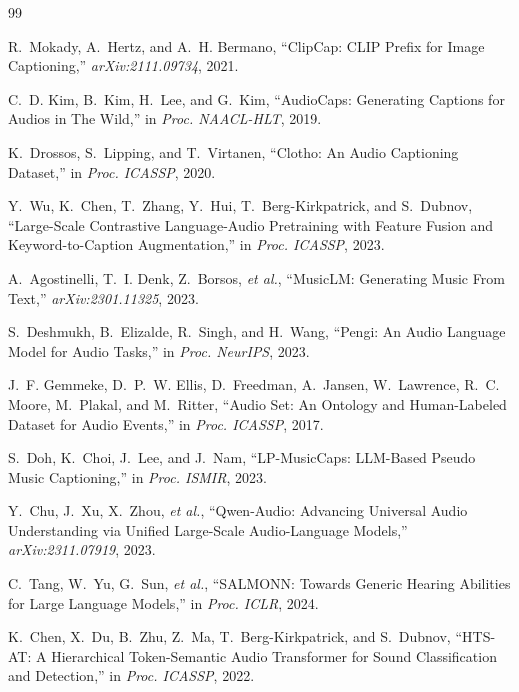 \documentclass[9pt]{report}
\begin{document}
\begingroup
\hypersetup{linkcolor=red}  %
\begin{thebibliography}{99}

R.~Mokady, A.~Hertz, and A.~H. Bermano,
``ClipCap: CLIP Prefix for Image Captioning,'' \emph{arXiv:2111.09734}, 2021.

C.~D. Kim, B.~Kim, H.~Lee, and G.~Kim,
``AudioCaps: Generating Captions for Audios in The Wild,'' in \emph{Proc. NAACL-HLT}, 2019.

K.~Drossos, S.~Lipping, and T.~Virtanen,
``Clotho: An Audio Captioning Dataset,'' in \emph{Proc. ICASSP}, 2020.

Y.~Wu, K.~Chen, T.~Zhang, Y.~Hui, T.~Berg-Kirkpatrick, and S.~Dubnov,
``Large-Scale Contrastive Language-Audio Pretraining with Feature Fusion and
Keyword-to-Caption Augmentation,'' in \emph{Proc. ICASSP}, 2023.

A.~Agostinelli, T.~I. Denk, Z.~Borsos, \emph{et al.},
``MusicLM: Generating Music From Text,'' \emph{arXiv:2301.11325}, 2023.

S.~Deshmukh, B.~Elizalde, R.~Singh, and H.~Wang,
``Pengi: An Audio Language Model for Audio Tasks,'' in \emph{Proc. NeurIPS}, 2023.

J.~F. Gemmeke, D.~P.~W. Ellis, D.~Freedman, A.~Jansen, W.~Lawrence, R.~C. Moore,
M.~Plakal, and M.~Ritter,
``Audio Set: An Ontology and Human-Labeled Dataset for Audio Events,'' in \emph{Proc. ICASSP},
2017.

S.~Doh, K.~Choi, J.~Lee, and J.~Nam,
``LP-MusicCaps: LLM-Based Pseudo Music Captioning,'' in \emph{Proc. ISMIR}, 2023.

Y.~Chu, J.~Xu, X.~Zhou, \emph{et al.},
``Qwen-Audio: Advancing Universal Audio Understanding via Unified Large-Scale Audio-Language
Models,'' \emph{arXiv:2311.07919}, 2023.

C.~Tang, W.~Yu, G.~Sun, \emph{et al.},
``SALMONN: Towards Generic Hearing Abilities for Large Language Models,'' in \emph{Proc. ICLR},
2024.

K.~Chen, X.~Du, B.~Zhu, Z.~Ma, T.~Berg-Kirkpatrick, and S.~Dubnov,
``HTS-AT: A Hierarchical Token-Semantic Audio Transformer for Sound Classification and
Detection,'' in \emph{Proc. ICASSP}, 2022.


\end{thebibliography}
\end{document}
